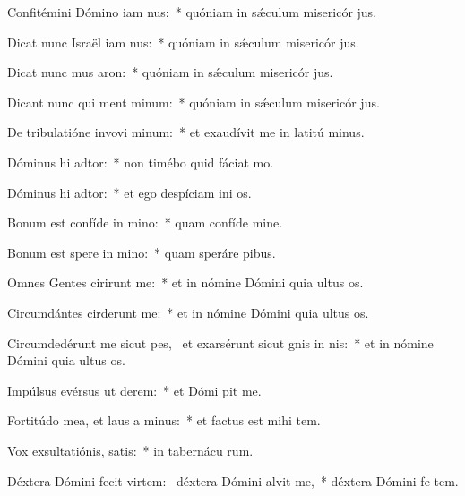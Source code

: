 \item Confitémini Dómino iam nus:~* quóniam in sǽculum misericór jus.
\item Dicat nunc Israël iam nus:~* quóniam in sǽculum misericór jus.
\item Dicat nunc mus aron:~* quóniam in sǽculum misericór jus.
\item Dicant nunc qui ment minum:~* quóniam in sǽculum misericór jus.
\item De tribulatióne invovi minum:~* et exaudívit me in latitú minus.
\item Dóminus hi adtor:~* non timébo quid fáciat  mo.
\item Dóminus hi adtor:~* et ego despíciam ini os.
\item Bonum est confíde in mino:~* quam confíde  mine.
\item Bonum est spere in mino:~* quam speráre  pibus.
\item Omnes Gentes cirirunt me:~* et in nómine Dómini quia ultus   os.
\item Circumdántes cirderunt me:~* et in nómine Dómini quia ultus   os.
\item Circumdedérunt me sicut pes,~\pscross{} et exarsérunt sicut gnis in nis:~* et in nómine Dómini quia ultus   os.
\item Impúlsus evérsus  ut derem:~* et Dómi pit me.
\item Fortitúdo mea, et laus a minus:~* et factus est mihi  tem.
\item Vox exsultatiónis,  satis:~* in tabernácu rum.
\item Déxtera Dómini fecit virtem:~\pscross{} déxtera Dómini alvit me,~* déxtera Dómini fe tem.
